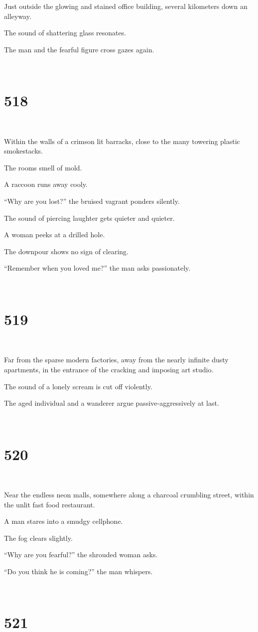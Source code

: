 \documentclass{report}
\begin{document}
Just outside the glowing and stained office building, several kilometers down an alleyway.

The sound of shattering glass resonates.

The man and the fearful figure cross gazes again.

~
\chapter*{518}
~

Within the walls of a crimson lit barracks, close to the many towering plastic smokestacks.

The rooms smell of mold.

A raccoon runs away cooly.

``Why are you lost?'' the bruised vagrant ponders silently.

The sound of piercing laughter gets quieter and quieter.

A woman peeks at a drilled hole.

The downpour shows no sign of clearing.

``Remember when you loved me?'' the man asks passionately.

~
\chapter*{519}
~

Far from the sparse modern factories, away from the nearly infinite dusty apartments, in the entrance of the cracking and imposing art studio.

The sound of a lonely scream is cut off violently.

The aged individual and a wanderer argue passive-aggressively at last.

~
\chapter*{520}
~

Near the endless neon malls, somewhere along a charcoal crumbling street, within the unlit fast food restaurant.

A man stares into a smudgy cellphone.

The fog clears slightly.

``Why are you fearful?'' the shrouded woman asks.

``Do you think he is coming?'' the man whispers.

~
\chapter*{521}
~
\end{document}
